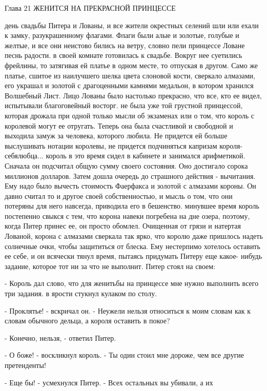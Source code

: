 Глава 21
 ЖЕНИТСЯ НА ПРЕКРАСНОЙ ПРИНЦЕССЕ
\par{} день свадьбы Питера и Лованы, и все жители окрестных 
селений шли или ехали к замку, разукрашенному флагами. Флаги были алые 
и золотые, голубые и желтые, и все они неистово бились на ветру, 
словно пели принцессе Ловане песнь радости.
 в своей комнате готовилась к свадьбе. Вокруг нее суетились 
фрейлины, то затягивая ей платье в одном месте, то отпуская в другом. 
Само же платье, сшитое из наилучшего шелка цвета слоновой кости, 
сверкало алмазами, его украшал и золотой с драгоценными камнями 
медальон, в котором хранился Волшебный Лист. Лицо Лованы было 
настолько прекрасно, что все, кто ее видел, испытывали благоговейный 
восторг.
 не была уже той грустной принцессой, которая дрожала при 
одной только мысли об экзаменах или о том, что король с королевой 
могут ее отругать. Теперь она была счастливой и свободной и выходила 
замуж за человека, которого любила. Не придется ей больше выслушивать 
нотации королевы, не придется подчиняться капризам короля-себялюбца...
 король в это время сидел в кабинете и занимался арифметикой. 
Сначала он подсчитал общую сумму своего состояния. Оно достигало 
сорока миллионов долларов. Затем дошла очередь до страшного действия - 
вычитания. Ему надо было вычесть стоимость Фаерфакса и золотой с 
алмазами короны. Он давно считал то и другое своей собственностью, и 
мысль о том, что они потеряны для него навсегда, приводила его в 
бешенство.
 минувшее время король постепенно свыкся с тем, что корона 
навеки погребена на дне озера, поэтому, когда Питер принес ее, он 
просто обомлел. Очищенная от грязи и натертая Лованой, корона с 
алмазами сверкала так ярко, что королю даже пришлось надеть солнечные 
очки, чтобы защититься от блеска. Ему нестерпимо хотелось оставить ее 
себе, и он всячески тянул время, пытаясь придумать Питеру еще какое-
нибудь задание, которое тот ни за что не выполнит.
 Питер стоял на своем:
\par- Король дал слово, что для женитьбы на принцессе мне нужно 
выполнить всего три задания.
 в ярости стукнул кулаком по столу.
\par- Проклятье! - вскричал он. - Неужели нельзя относиться к моим 
словам как к словам обычного дельца, а короля оставить в покое?
\par- Конечно, нельзя, - ответил Питер.
\par- О боже! - воскликнул король. - Ты один стоил мне дороже, чем все 
другие претенденты!
\par- Еще бы! - усмехнулся Питер. - Всех остальных вы убивали, а их 

